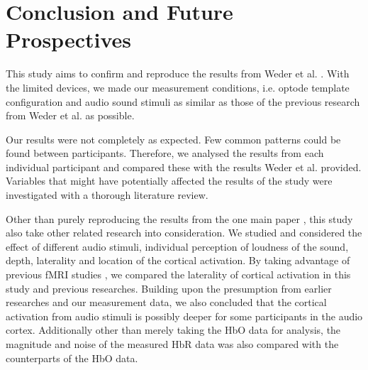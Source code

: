 \chapter{Conclusion and Future Prospectives}
This study aims to confirm and reproduce the results from Weder et al. \citeyear{Weder2018}. With the limited devices, we made our measurement conditions, i.e. optode template configuration and audio sound stimuli as similar as those of the previous research from Weder et al. \citeyear{Weder2018} as possible.

Our results were not completely as expected. Few common patterns could be found between participants. Therefore,  we analysed the results from each individual participant and compared these with the results Weder et al. \citeyear{Weder2018} provided. Variables that might have potentially affected the results of the study were investigated with a thorough literature review.

Other than purely reproducing the results from the one main paper \cite{Weder2018}, this study also take other related research into consideration.  We studied and considered the effect of different audio stimuli, individual perception of loudness of the sound, depth, laterality and location of the cortical activation. By taking advantage of previous fMRI studies \cite{Belin2000} \cite{Belin2002} \cite{Hall} \cite{Frost1999-vs}, we compared the laterality of cortical activation in this study and previous researches. Building upon the presumption from earlier researches and our measurement data, we also concluded that the cortical activation from audio stimuli is possibly deeper for some participants in the audio cortex. Additionally other than merely taking the HbO data for analysis, the magnitude and noise of the measured HbR data was also compared with the counterparts of the HbO data.